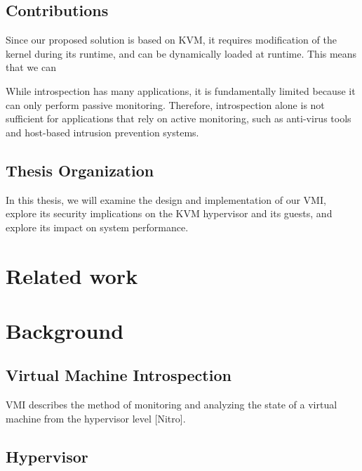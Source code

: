 \documentclass{report}
\begin{document}
\begin{spacing}{1.5}
\section{Contributions}


Since our proposed solution is based on KVM, it requires modification of the kernel during its runtime, and can be dynamically loaded at runtime. This means that we can 





While introspection has many applications, it is fundamentally limited because it can only perform passive monitoring. Therefore, introspection alone is not sufficient for applications that rely on active monitoring, such as anti-virus
tools and host-based intrusion prevention systems.











\section{Thesis Organization}

In this thesis, we will examine the design and implementation of our VMI, explore its security implications on the KVM hypervisor and its guests, and explore its impact on system performance.




\chapter{Related work}



\chapter{Background}






\section{Virtual Machine Introspection}

VMI describes the method of monitoring and analyzing the state of a virtual machine from the hypervisor level [Nitro]. 


\section{Hypervisor}


\end{spacing}
\end{document}
